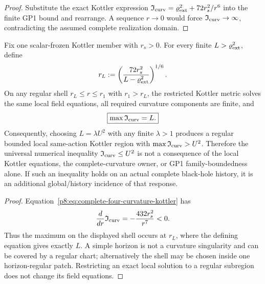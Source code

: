 \documentclass[12pt,a4paper]{article}
\begin{document}
\begin{proof}
Substitute the exact Kottler expression
\(
 \mathfrak I_{\rm curv}
 =\varrho_{\rm ext}^2+72r_s^2/r^6
\)
into the finite GP1 bound and rearrange.  A sequence \(r\to0\) would force
\(\mathfrak I_{\rm curv}\to\infty\), contradicting the assumed complete
realization domain.
\end{proof}

\begin{proposition}
\label{p8:prop:v2181-arbitrary-finite-kottler-shells}
Fix one scalar-frozen Kottler member with \(r_s>0\).  For every finite
\(L>\varrho_{\rm ext}^2\), define
\[
 r_L:=\left(\frac{72r_s^2}{L-\varrho_{\rm ext}^2}\right)^{1/6}.
\]
On any regular shell \(r_L\le r\le r_1\) with \(r_1>r_L\), the restricted
Kottler metric solves the same local field equations, all required curvature
components are finite, and
\begin{equation}
\label{p8:eq:v2181-arbitrary-finite-kottler-maximum}
 \boxed{
 \max\mathfrak I_{\rm curv}=L.}
\end{equation}
Consequently, choosing \(L=\lambda U^2\) with any finite \(\lambda>1\)
produces a regular bounded local same-action Kottler region with
\(\max\mathfrak I_{\rm curv}>U^2\).  Therefore the universal numerical
inequality \(\mathfrak I_{\rm curv}\le U^2\) is not a consequence of the
local Kottler equations, the complete-curvature owner, or GP1
family-boundedness alone.  If such an inequality holds on an actual complete
black-hole history, it is an additional global/history incidence of that
response.
\end{proposition}

\begin{proof}
Equation~\eqref{p8:eq:complete-four-curvature-kottler} has
\[
 \frac{d}{dr}\mathfrak I_{\rm curv}
 =-\frac{432r_s^2}{r^7}<0.
\]
Thus the maximum on the displayed shell occurs at \(r_L\), where the defining
equation gives exactly \(L\).  A simple horizon is not a curvature
singularity and can be covered by a regular chart; alternatively the shell
may be chosen inside one horizon-regular patch.  Restricting an exact local
solution to a regular subregion does not change its field equations.
\end{proof}
\end{document}
